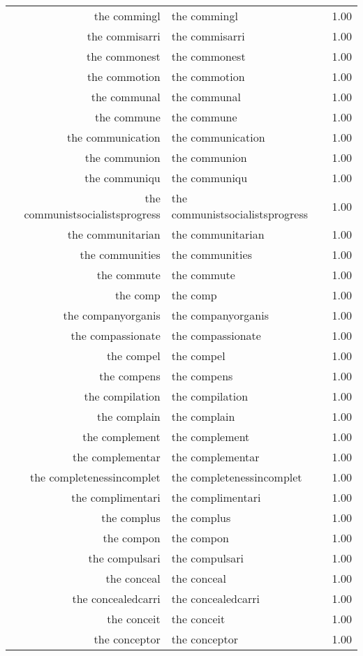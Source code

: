 \begin{table}[ht]
\begin{tabular}{rlr}
  the commingl & the commingl & 1.00 \\ 
  the commisarri & the commisarri & 1.00 \\ 
  the commonest & the commonest & 1.00 \\ 
  the commotion & the commotion & 1.00 \\ 
  the communal & the communal & 1.00 \\ 
  the commune & the commune & 1.00 \\ 
  the communication & the communication & 1.00 \\ 
  the communion & the communion & 1.00 \\ 
  the communiqu & the communiqu & 1.00 \\ 
  the communistsocialistsprogress & the communistsocialistsprogress & 1.00 \\ 
  the communitarian & the communitarian & 1.00 \\ 
  the communities & the communities & 1.00 \\ 
  the commute & the commute & 1.00 \\ 
  the comp & the comp & 1.00 \\ 
  the companyorganis & the companyorganis & 1.00 \\ 
  the compassionate & the compassionate & 1.00 \\ 
  the compel & the compel & 1.00 \\ 
  the compens & the compens & 1.00 \\ 
  the compilation & the compilation & 1.00 \\ 
  the complain & the complain & 1.00 \\ 
  the complement & the complement & 1.00 \\ 
  the complementar & the complementar & 1.00 \\ 
  the completenessincomplet & the completenessincomplet & 1.00 \\ 
  the complimentari & the complimentari & 1.00 \\ 
  the complus & the complus & 1.00 \\ 
  the compon & the compon & 1.00 \\ 
  the compulsari & the compulsari & 1.00 \\ 
  the conceal & the conceal & 1.00 \\ 
  the concealedcarri & the concealedcarri & 1.00 \\ 
  the conceit & the conceit & 1.00 \\ 
  the conceptor & the conceptor & 1.00 \\ 

\end{tabular}
\end{table}
